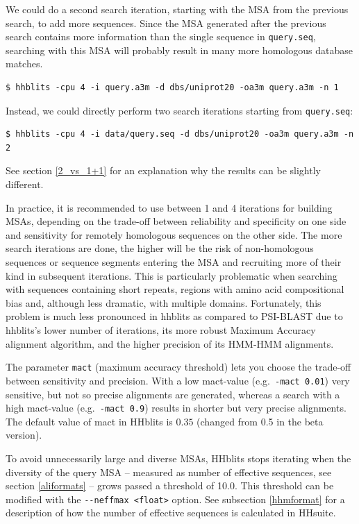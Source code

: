 \documentclass[11pt,a4paper]{article}
\begin{document}
We could do a second search iteration, starting with the MSA from the previous search, to add more sequences. Since the MSA generated after the previous search contains more information than the single sequence in \verb`query.seq`, searching with this MSA will probably result in many more homologous database matches.
\begin{verbatim}
$ hhblits -cpu 4 -i query.a3m -d dbs/uniprot20 -oa3m query.a3m -n 1
\end{verbatim}
Instead, we could directly perform two search iterations starting from \verb`query.seq`:
\begin{verbatim}
$ hhblits -cpu 4 -i data/query.seq -d dbs/uniprot20 -oa3m query.a3m -n 2 
\end{verbatim}
See section \ref{2_vs_1+1} for an explanation why the results can be slightly different.

In practice, it is recommended to use between 1 and 4 iterations for building MSAs, depending on the trade-off between reliability and specificity on one side and sensitivity for remotely homologous sequences on the other side. The more search iterations are done, the higher will be the risk of non-homologous sequences or sequence segments entering the MSA and recruiting more of their kind in subsequent iterations. This is particularly problematic when searching with sequences containing short repeats, regions with amino acid compositional bias and, although less dramatic,  with multiple domains. Fortunately, this problem is much less pronounced in hhblits as compared to PSI-BLAST due to hhblits's lower number of iterations, its more robust Maximum Accuracy alignment algorithm, and the higher precision of its HMM-HMM alignments. 

The parameter \verb`mact` (maximum accuracy threshold) lets you choose the trade-off between sensitivity and 
precision. With a low mact-value (e.g.\ \verb`-mact 0.01`) very sensitive, but not 
so precise alignments are generated, whereas a search with a high mact-value (e.g.\ \verb`-mact 0.9`) 
results in shorter but very precise alignments. The default value of mact in HHblits is $0.35$ 
(changed from 0.5 in the beta version). 

To avoid unnecessarily large and diverse MSAs, HHblits stops iterating when the diversity of the query MSA -- measured as number of effective sequences, see section \ref{aliformats} -- grows passed a threshold of 10.0. This threshold can be modified with the \verb`--neffmax <float>` option. See subsection \ref{hhmformat} for a description of how the number of effective sequences is calculated in HHsuite.
\end{document}
